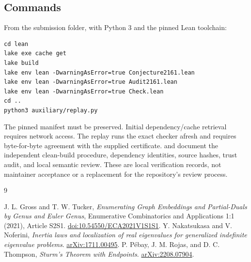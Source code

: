 \documentclass[11pt]{article}
\newcommand{\lean}[1]{\texttt{\detokenize{#1}}}
\begin{document}
\subsection{Commands}
From the submission folder, with Python 3 and the pinned Lean toolchain:
\begin{verbatim}
cd lean
lake exe cache get
lake build
lake env lean -DwarningAsError=true Conjecture2161.lean
lake env lean -DwarningAsError=true Audit2161.lean
lake env lean -DwarningAsError=true Check.lean
cd ..
python3 auxiliary/replay.py
\end{verbatim}
The pinned manifest must be preserved. Initial dependency/cache retrieval
requires network access. The replay runs the exact checker afresh and
requires byte-for-byte agreement with the supplied certificate.
\lean{README.md} and \lean{verification/} document the independent clean-build
procedure, dependency identities, source hashes, trust audit, and local
semantic review. These are local verification records, not maintainer
acceptance or a replacement for the repository's review process.

\begin{thebibliography}{9}\small\raggedright
{} J. L. Gross and T. W. Tucker,
\emph{Enumerating Graph Embeddings and Partial-Duals by Genus and Euler Genus},
Enumerative Combinatorics and Applications 1:1 (2021), Article S2S1.
\href{https://doi.org/10.54550/ECA2021V1S1S1}{doi:10.54550/ECA2021V1S1S1}.
 Y. Nakatsukasa and V. Noferini,
\emph{Inertia laws and localization of real eigenvalues for generalized
indefinite eigenvalue problems}.
\href{https://arxiv.org/abs/1711.00495}{arXiv:1711.00495}.
 P. P\'ebay, J. M. Rojas, and D. C. Thompson,
\emph{Sturm's Theorem with Endpoints}.
\href{https://arxiv.org/abs/2208.07904}{arXiv:2208.07904}.
\end{thebibliography}
\end{document}
